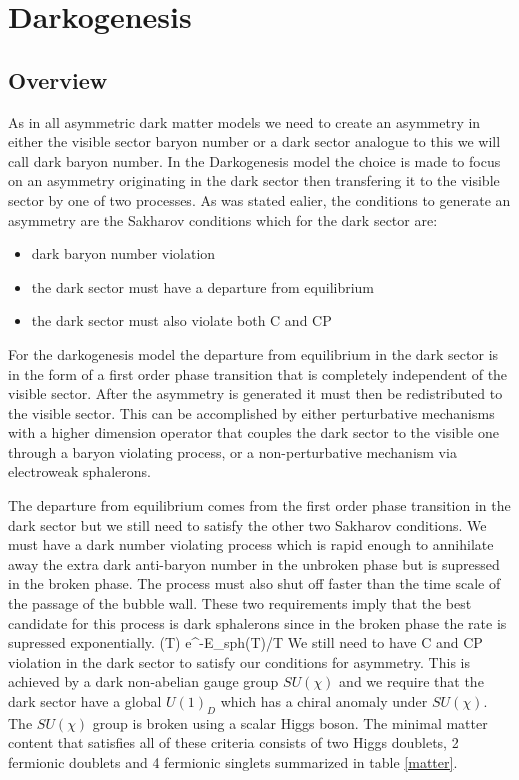 
\section{Darkogenesis}

\subsection{Overview}
As in all asymmetric dark matter models we need to create an asymmetry in either the visible sector baryon number or a dark sector analogue to this we will call dark 
baryon number. In the Darkogenesis model the choice is made to focus on an asymmetry originating in the dark sector then transfering it to the visible sector by one of 
two processes. As was stated ealier, the conditions to generate an asymmetry are the Sakharov conditions which for the dark sector are:
\begin{itemize}
    \item dark baryon number violation
    \item the dark sector must have a departure from equilibrium
    \item the dark sector must also violate both C and CP
\end{itemize}
For the darkogenesis model the departure from equilibrium in the dark sector is in the form of a first order phase transition that is completely independent of the 
visible sector. After the asymmetry is generated it must then be redistributed to the visible sector. This can be accomplished by either perturbative mechanisms 
with a higher dimension operator that couples the dark sector to the visible one through a baryon violating process, or a non-perturbative mechanism via 
electroweak sphalerons.

The departure from equilibrium comes from the first order phase transition in the dark sector but we still need to satisfy the other two Sakharov conditions. We must 
have a dark number violating process which is rapid enough to annihilate away the extra dark anti-baryon number in the unbroken phase but is supressed in the broken phase. 
The process must also shut off faster than the time scale of the passage of the bubble wall. These two requirements imply that the best candidate for this process is 
dark sphalerons since in the broken phase the rate is supressed exponentially.
\beq
    \Gamma(T) \propto e^{-E_{sph}(T)/T}
\eeq
We still need to have C and CP violation in the dark sector to satisfy our conditions for asymmetry. This is achieved by a dark non-abelian gauge group $SU(\chi)$ and we 
require that the dark sector have a global $U(1)_D$ which has a chiral anomaly under $SU(\chi)$. The $SU(\chi)$ group is broken using a scalar Higgs boson. The minimal 
matter content that satisfies all of these criteria consists of two Higgs doublets, 2 fermionic doublets and 4 fermionic singlets \cite{darko} summarized in table \ref{matter}. 

